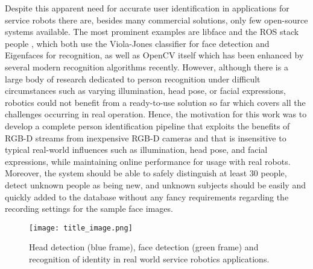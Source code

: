 Despite this apparent need for accurate user identification in applications for service robots there are, besides many commercial solutions, only few open-source systems available. The most prominent examples are libface \cite{jironkin2010} and the ROS stack people \cite{pantofaru2010}, which both use the Viola-Jones classifier \cite{Viola01} for face detection and Eigenfaces \cite{Turk1991} for recognition, as well as OpenCV \cite{bradski2008} itself which has been enhanced by several modern recognition algorithms recently. However, although there is a large body of research dedicated to person recognition under difficult circumstances such as varying illumination, head pose, or facial expressions, robotics could not benefit from a ready-to-use solution so far which covers all the challenges occurring in real operation. Hence, the motivation for this work was to develop a complete person identification pipeline that exploits the benefits of RGB-D streams from inexpensive RGB-D cameras and that is insensitive to typical real-world influences such as illumination, head pose, and facial expressions, while maintaining online performance for usage with real robots. Moreover, the system should be able to safely distinguish at least 30 people, detect unknown people as being new, and unknown subjects should be easily and quickly added to the database without any fancy requirements regarding the recording settings for the sample face images.



\begin{figure}[t]
	\begin{center}
		\texttt{[image: title\_image.png]}
	\end{center}
	\caption{Head detection (blue frame), face detection (green frame) and recognition of identity in real world service robotics applications.} \vspace{-2mm}
	\label{fig:covergirl}
\end{figure}

